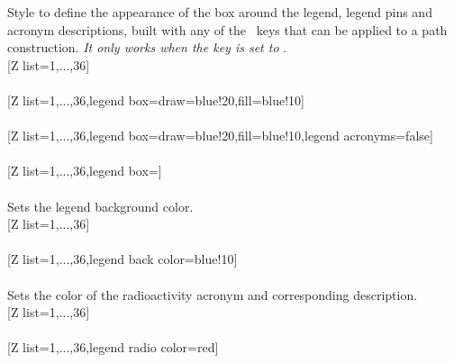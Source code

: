 \label{style_legend box}%
%
{Style to define the appearance of the box around the legend, legend pins and acronym descriptions, built with any of the \txttikz\ keys that can be applied to a path construction.
\textit{It only works when the key  is set to }.}%
\\ [5pt][Z list={1,...,36}]%
\\ [5pt]\makebox[\linewidth][c]{\scalebox{.6}{\pgfPT[Z list={1,...,36}]}}%
\\ [5pt][Z list={1,...,36},legend box={draw=blue!20,fill=blue!10}]%
\\ [5pt]\makebox[\linewidth][c]{\scalebox{.6}{\pgfPT[Z list={1,...,36},legend box={draw=blue!20,fill=blue!10}]}}%
\\ [5pt][Z list={1,...,36},legend box={draw=blue!20,fill=blue!10,legend acronyms=false}]%
\\ [5pt]\makebox[\linewidth][c]{\scalebox{.6}{\pgfPT[Z list={1,...,36},legend box={draw=blue!20,fill=blue!10},legend acronyms=false]}}%
\\ [5pt][Z list={1,...,36},legend box={}]%
\\ [5pt]\makebox[\linewidth][c]{\scalebox{.6}{\pgfPT[Z list={1,...,36},legend box={}]}}%
\\ [0pt]\pgfPTendstyle%
\label{option_legend back color}%
%
{Sets the legend background color.}%
\\ [5pt][Z list={1,...,36}]%
\\ [10pt]\makebox[\linewidth][c]{\scalebox{.6}{\pgfPT[Z list={1,...,36}]}}%
\\ [10pt][Z list={1,...,36},legend back color=blue!10]%
\\ [10pt]\makebox[\linewidth][c]{\scalebox{.6}{\pgfPT[Z list={1,...,36},legend back color=blue!10]}}%
\\ [0pt]\pgfPTendoption%
\label{option_legend radio color}%
%
{Sets the color of the radioactivity acronym and corresponding description.}%
\\ [5pt][Z list={1,...,36}]%
\\ [10pt]\makebox[\linewidth][c]{\scalebox{.6}{\pgfPT[Z list={1,...,36}]}}%
\\ [10pt][Z list={1,...,36},legend radio color=red]%
